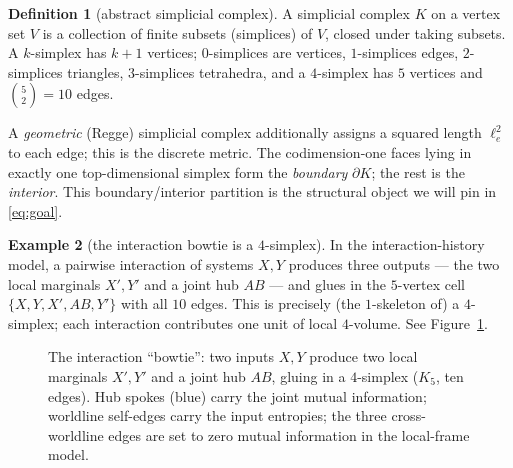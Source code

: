 \documentclass[11pt]{article}
\newcommand{\bd}{\partial}
\theoremstyle{definition}
\newtheorem{definition}{Definition}[section]
\newtheorem{example}[definition]{Example}
\theoremstyle{plain}
\begin{document}
\begin{definition}[abstract simplicial complex]
A simplicial complex $K$ on a vertex set $V$ is a collection of finite subsets (simplices)
of $V$, closed under taking subsets. A $k$-simplex has $k+1$ vertices; $0$-simplices are
vertices, $1$-simplices edges, $2$-simplices triangles, $3$-simplices tetrahedra, and a
$4$-simplex has $5$ vertices and $\binom{5}{2}=10$ edges.
\end{definition}

A \emph{geometric} (Regge) simplicial complex additionally assigns a squared length
$\ell_e^2$ to each edge; this is the discrete metric. The codimension-one faces lying in
exactly one top-dimensional simplex form the \emph{boundary} $\bd K$; the rest is the
\emph{interior}. This boundary/interior partition is the structural object we will pin in
\eqref{eq:goal}.

\begin{example}[the interaction bowtie is a $4$-simplex]
In the interaction-history model, a pairwise interaction of systems $X,Y$ produces three
outputs --- the two local marginals $X',Y'$ and a joint hub $AB$ --- and glues in the
$5$-vertex cell $\{X,Y,X',AB,Y'\}$ with all $10$ edges. This is precisely (the $1$-skeleton
of) a $4$-simplex; each interaction contributes one unit of local $4$-volume.
See Figure~\ref{fig:bowtie}.
\end{example}

\begin{figure}[t]
\centering
{}
\caption{The interaction ``bowtie'': two inputs $X,Y$ produce two local marginals $X',Y'$
and a joint hub $AB$, gluing in a $4$-simplex ($K_5$, ten edges). Hub spokes (blue) carry
the joint mutual information; worldline self-edges carry the input entropies; the three
cross-worldline edges are set to zero mutual information in the local-frame model.}
\label{fig:bowtie}
\end{figure}

\end{document}
